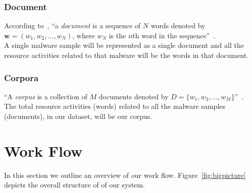 \subsubsection{Document}
According to~\citeauthor{Blei}, ``a \emph{document} is a sequence of $N$ words denoted by $\textbf{w} = (w_1,w_2,\ldots,w_N)$, where $w_N$ is the $n$th word in the sequence''~\cite[]{Blei}.\\
A single malware sample will be represented as a single document and all the resource activities related to that malware will be the words in that document.
\label{ssub:Document}
\subsubsection{Corpora}
\label{ssub:Corpora}
``A \emph{corpus} is a collection of $M$ documents denoted by $D = \{w_1,w_2,\ldots,w_M\}$''~\cite[]{Blei}.\\
The total resource activities (words) related to all the malware samples (documents), in our dataset, will be our corpus.\\

\section{Work Flow}
\label{sec:Work Flow}
In this section we outline an overview of our work flow.
Figure~\ref{fig:bigpicture} depicts the overall structure of of our system.\\
